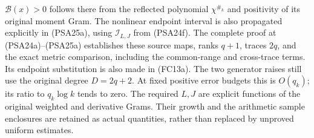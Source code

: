 $\mathcal B(x)>0$ follows there from the reflected polynomial
$\chi^{\#_k}$ and positivity of its original moment Gram.
The nonlinear endpoint interval is also propagated explicitly
in (PSA25a), using $\mathcal I_{L,J}$ from (PSA24f).
The complete proof at (PSA24a)--(PSA25a) establishes these source
maps, ranks $q+1$, traces $2q$, and the exact metric comparison,
including the common-range and cross-trace terms. Its endpoint
substitution is also made in (FC13a). The two generator raises
still use the original degree $D=2q+2$.
At fixed positive error budgets this is $O(q_k)$; its ratio to
$q_k\log k$ tends to zero. The required $L,J$ are explicit functions
of the original weighted and derivative Grams. Their growth and the
arithmetic sample enclosures are retained as actual quantities, rather
than replaced by unproved uniform estimates.

